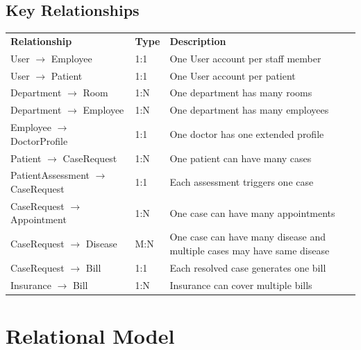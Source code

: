 \documentclass{article}
\newcommand{\theadcell}{\color{white}\bfseries}
\begin{document}
\subsection{Key Relationships}

\begin{center}
\begin{tabular}{L{4.5cm} C{2cm} L{6.5cm}}
   \theadcell Relationship & \theadcell Type & \theadcell Description \\
   User $\to$ Employee              & 1:1 & One User account per staff member \\
   User $\to$ Patient               & 1:1 & One User account per patient \\
   Department $\to$ Room            & 1:N & One department has many rooms \\
   Department $\to$ Employee        & 1:N & One department has many employees \\
   Employee $\to$ DoctorProfile     & 1:1 & One doctor has one extended profile \\
   Patient $\to$ CaseRequest        & 1:N & One patient can have many cases \\
   PatientAssessment $\to$ CaseRequest & 1:1 & Each assessment triggers one case \\
   CaseRequest $\to$ Appointment    & 1:N & One case can have many appointments \\
   CaseRequest $\to$ Disease      & M:N & One case can have many disease and multiple cases may have same disease \\
   CaseRequest $\to$ Bill           & 1:1 & Each resolved case generates one bill \\
   Insurance $\to$ Bill      & 1:N & Insurance can cover multiple bills \\
\end{tabular}
\end{center}

\newpage

\section{Relational Model}
\end{document}
